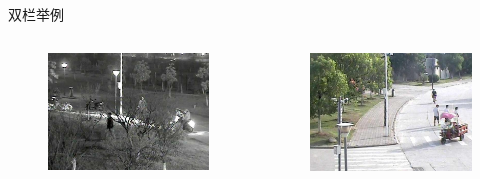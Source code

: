 \documentclass[aspectratio=169]{ahu-slide}
\newlength{\pheight}
\begin{document}
\begin{frame}{双栏举例}

    \vskip -0.5cm
    \begin{table}
    \end{table}
    
    \vskip -0.3cm
    \begin{columns}
        \begin{figure}
            \centering
            \includegraphics[height=0.7\pheight]{paper_figs/RGB_1.jpg}
        \end{figure}
        \vskip -0.5cm
        \begin{figure}
            \centering
            \includegraphics[height=0.7\pheight]{paper_figs/RGB_2.jpg}
        \end{figure}
    

\end{columns}
\end{frame}
\end{document}
